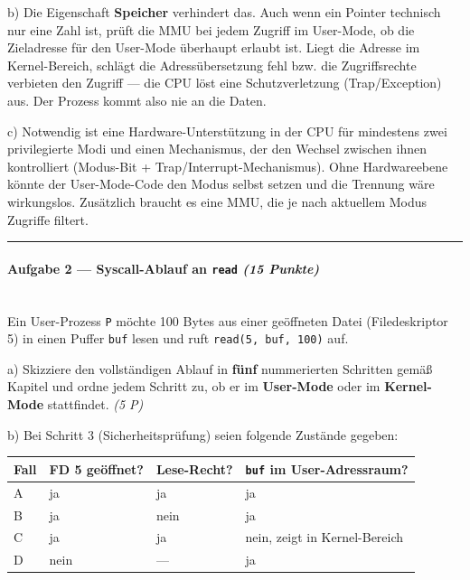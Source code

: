 \documentclass[11pt, a4paper]{article}
\begin{document}
b) Die Eigenschaft \textbf{Speicher} verhindert das. Auch wenn ein Pointer technisch nur eine Zahl ist, prüft die MMU bei jedem Zugriff im User-Mode, ob die Zieladresse für den User-Mode überhaupt erlaubt ist. Liegt die Adresse im Kernel-Bereich, schlägt die Adressübersetzung fehl bzw. die Zugriffsrechte verbieten den Zugriff — die CPU löst eine Schutzverletzung (Trap/Exception) aus. Der Prozess kommt also nie an die Daten.


c) Notwendig ist eine Hardware-Unterstützung in der CPU für mindestens zwei privilegierte Modi und einen Mechanismus, der den Wechsel zwischen ihnen kontrolliert (Modus-Bit + Trap/Interrupt-Mechanismus). Ohne Hardwareebene könnte der User-Mode-Code den Modus selbst setzen und die Trennung wäre wirkungslos. Zusätzlich braucht es eine MMU, die je nach aktuellem Modus Zugriffe filtert.



\noindent\textcolor{rulegray}{\rule{\linewidth}{0.4pt}}


\paragraph{Aufgabe 2 — Syscall-Ablauf an \texttt{read} \textit{(15 Punkte)}}\mbox{}\\[2pt]

Ein User-Prozess \texttt{P} möchte 100 Bytes aus einer geöffneten Datei (Filedeskriptor 5) in einen Puffer \texttt{buf} lesen und ruft \texttt{read(5, buf, 100)} auf.


a) Skizziere den vollständigen Ablauf in \textbf{fünf} nummerierten Schritten gemäß Kapitel und ordne jedem Schritt zu, ob er im \textbf{User-Mode} oder im \textbf{Kernel-Mode} stattfindet. \textit{(5 P)}


b) Bei Schritt 3 (Sicherheitsprüfung) seien folgende Zustände gegeben:



{\small
\begin{tabularx}{\linewidth}{XXXX}
\hline
\rowcolor{tableheadbg}
{\color{white}\textbf{Fall}} & {\color{white}\textbf{FD 5 geöffnet?}} & {\color{white}\textbf{Lese-Recht?}} & {\color{white}\textbf{\texttt{buf} im User-Adressraum?}} \\[2pt]
\hline
\endhead
\hline
\endfoot
A & ja & ja & ja \\
B & ja & nein & ja \\
C & ja & ja & nein, zeigt in Kernel-Bereich \\
D & nein & — & ja \\
\end{tabularx}
}
\end{document}
